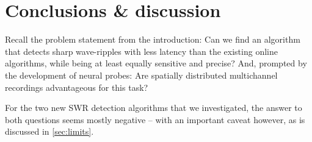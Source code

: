 \chapter{Conclusions \& discussion}
\label{ch:conclusions}

Recall the problem statement from the introduction: Can we find an algorithm that detects sharp wave-ripples with less latency than the existing online algorithms, while being at least equally sensitive and precise? And, prompted by the development of neural probes: Are spatially distributed multichannel recordings advantageous for this task?

For the two new SWR detection algorithms that we investigated, the answer to both questions seems mostly negative -- with an important caveat however, as is discussed in \cref{sec:limits}.






